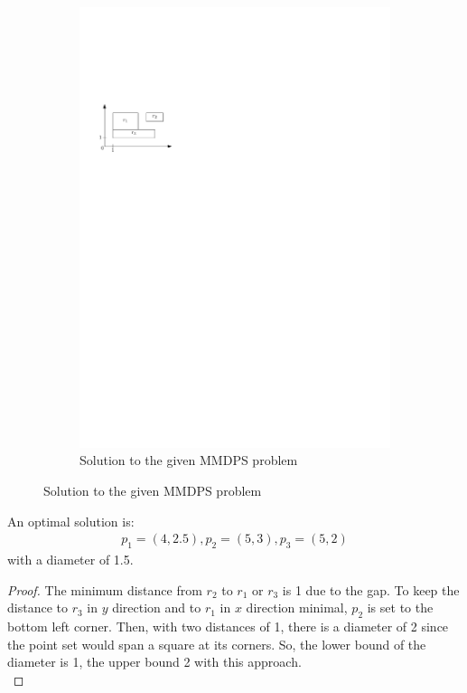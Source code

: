 \documentclass[a4paper,12pt,headsepline]{scrartcl}
\begin{document}
\begin{enumerate}[a)]
\begin{figure}[H]
\begin{subfigure}{0.48\textwidth}
			\centering
			\includegraphics[width=1\linewidth,page=2]{graphics/7_2.pdf}
			\caption*{Solution to the given MMDPS problem}
		\end{subfigure}
	\end{figure}
An optimal solution is:
\begin{align*}
	p_1 = (4,2.5), p_2 = (5,3), p_3 = (5,2)
\end{align*}
with a diameter of 1.5.
\begin{proof}
	The minimum distance from $r_2$ to $r_1$ or $r_3$ is 1 due to the gap. To keep the distance to $r_3$ in $y$ direction and to $r_1$ in $x$ direction minimal, $p_2$ is set to the bottom left corner. Then, with two distances of 1, there is a diameter of 2 since the point set would span a square at its corners. So, the lower bound of the diameter is 1, the upper bound 2 with this approach.\\

\end{proof}
\end{enumerate}
\end{document}

